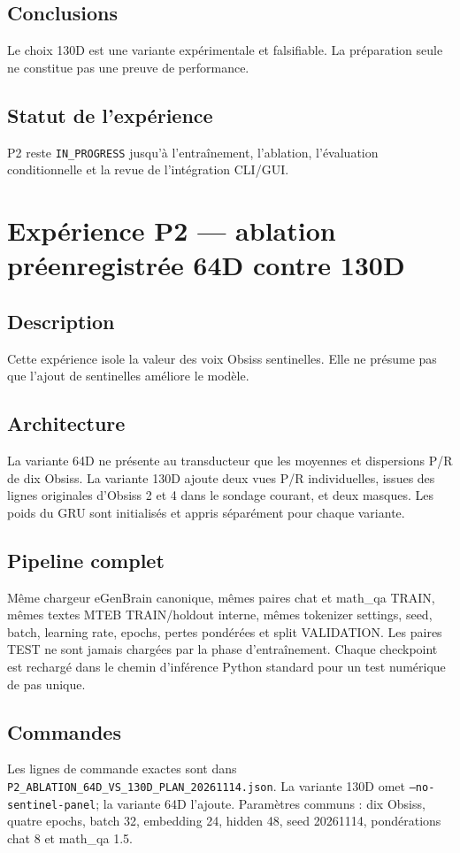 \documentclass[11pt,a4paper]{report}
\begin{document}
\section{Conclusions}
Le choix 130D est une variante expérimentale et falsifiable. La préparation seule ne constitue pas une preuve de performance.
\section{Statut de l'expérience}
P2 reste \texttt{IN\_PROGRESS} jusqu'à l'entraînement, l'ablation, l'évaluation conditionnelle et la revue de l'intégration CLI/GUI.


\chapter{Expérience P2 — ablation préenregistrée 64D contre 130D}
\section{Description}
Cette expérience isole la valeur des voix Obsiss sentinelles. Elle ne présume pas que l'ajout de sentinelles améliore le modèle.
\section{Architecture}
La variante 64D ne présente au transducteur que les moyennes et dispersions P/R de dix Obsiss. La variante 130D ajoute deux vues P/R individuelles, issues des lignes originales d'Obsiss 2 et 4 dans le sondage courant, et deux masques. Les poids du GRU sont initialisés et appris séparément pour chaque variante.
\section{Pipeline complet}
Même chargeur eGenBrain canonique, mêmes paires chat et math\_qa TRAIN, mêmes textes MTEB TRAIN/holdout interne, mêmes tokenizer settings, seed, batch, learning rate, epochs, pertes pondérées et split VALIDATION. Les paires TEST ne sont jamais chargées par la phase d'entraînement. Chaque checkpoint est rechargé dans le chemin d'inférence Python standard pour un test numérique de pas unique.
\section{Commandes}
Les lignes de commande exactes sont dans \texttt{P2\_ABLATION\_64D\_VS\_130D\_PLAN\_20261114.json}. La variante 130D omet \texttt{--no-sentinel-panel}; la variante 64D l'ajoute. Paramètres communs : dix Obsiss, quatre epochs, batch 32, embedding 24, hidden 48, seed 20261114, pondérations chat 8 et math\_qa 1.5.
\end{document}
